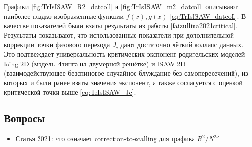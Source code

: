 Графики \ref{fig:TrIsISAW_R2_datcoll} и \ref{fig:TrIsISAW_m2_datcoll} описывают наиболее гладко изображенные функции $f(x), g(x)$ \eqref{eq:TrIsISAW_datcoll}.
В качестве показателей были взяты результаты из работы \ref{faizullina2021critical}.
Результаты показывают, что использованные показатели при дополнительной коррекции точки фазового перехода $J_c$ дают достаточно чёткий коллапс данных.
Это подтвеждает универсальность критических экспонент родительских моделей Ising 2D (модель Изинга на двумерной решётке) 
и ISAW 2D (взаимодействующее безспиновое случайное блуждание без самопересечений), из которых и были ранее взяты значения экспонент,
а также согласуется с оценкой критической точки выше \eqref{eq:TrIsISAW_Jc}.


\subsection{Вопросы}

\begin{itemize}
\item Статья 2021: что означает correction-to-scalling для графика $R^2 / N^{2\nu}$
\end{itemize}

